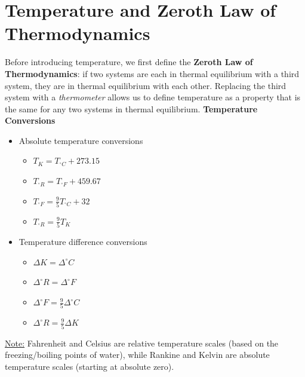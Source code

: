 \documentclass[12pt]{article}
\begin{document}
\section*{Temperature and Zeroth Law of Thermodynamics}
Before introducing temperature, we first define the \textbf{Zeroth Law of Thermodynamics}: if two systems are each in thermal equilibrium with a third system, they are in thermal equilibrium with each other. Replacing the third system with a \textit{thermometer} allows us to define temperature as a property that is the same for any two systems in thermal equilibrium.\newpage\noindent
\textbf{Temperature Conversions}
\begin{itemize}[label=\textbullet]
    \item Absolute temperature conversions
    \begin{itemize}[label=\textopenbullet]
        \item $T_{K} = T_{^\circ C} + 273.15$
        \item $T_{^\circ R} = T_{^\circ F} + 459.67$
        \item $T_{^\circ F} = \frac{9}{5}T_{^\circ C} + 32$
        \item $T_{^\circ R} = \frac{9}{5}T_{K}$
    \end{itemize}
    \item Temperature difference conversions
    \begin{itemize}[label=\textopenbullet]
        \item $\Delta K = \Delta ^\circ C$
        \item $\Delta ^\circ R = \Delta ^\circ F$
        \item $\Delta ^\circ F = \frac{9}{5}\Delta ^\circ C$
        \item $\Delta ^\circ R = \frac{9}{5}\Delta K$
    \end{itemize}
\end{itemize}
\underline{Note:} Fahrenheit and Celsius are relative temperature scales (based on the freezing/boiling points of water), while Rankine and Kelvin are absolute temperature scales (starting at absolute zero).
\end{document}

